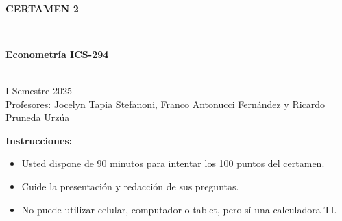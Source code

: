 \documentclass[10pt,a4paper]{article}
\begin{document}
\vspace{5cm}



\begin{center}
\begin{large}
\textbf{\\CERTAMEN 2}
\end{large}\\
\end{center}

\begin{center}
\begin{large}
\textbf{Econometría ICS-294}
\end{large}\\
\vspace{0.2cm}
I Semestre 2025\\
Profesores: Jocelyn Tapia Stefanoni, Franco Antonucci Fernández y Ricardo Pruneda Urz\'ua\\
\end{center}

\textbf{Instrucciones:} 

\begin{itemize}

    \item Usted dispone de 90 minutos  para intentar los 100 puntos del certamen.
    \item Cuide la presentación y redacción de sus preguntas.
    \item No puede utilizar celular, computador o tablet, pero sí una calculadora TI.
     
\end{itemize}
\end{document}
